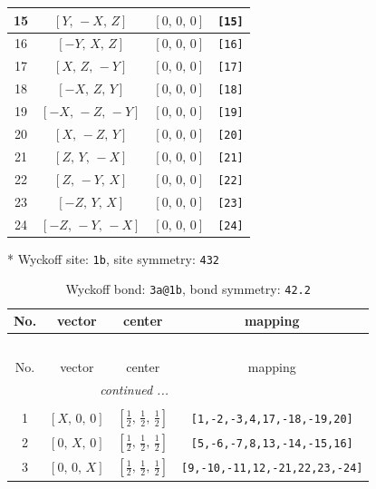\documentclass[fleqn,8pt]{jsarticle}
\begin{document}
\begin{longtable}{cccc}
15 & $\left[ Y,\, - X,\, Z \right]$ & $\left[ 0,\, 0,\, 0 \right]$ & {\tt [15]} \\ \hline
16 & $\left[ - Y,\, X,\, Z \right]$ & $\left[ 0,\, 0,\, 0 \right]$ & {\tt [16]} \\ \hline
17 & $\left[ X,\, Z,\, - Y \right]$ & $\left[ 0,\, 0,\, 0 \right]$ & {\tt [17]} \\ \hline
18 & $\left[ - X,\, Z,\, Y \right]$ & $\left[ 0,\, 0,\, 0 \right]$ & {\tt [18]} \\ \hline
19 & $\left[ - X,\, - Z,\, - Y \right]$ & $\left[ 0,\, 0,\, 0 \right]$ & {\tt [19]} \\ \hline
20 & $\left[ X,\, - Z,\, Y \right]$ & $\left[ 0,\, 0,\, 0 \right]$ & {\tt [20]} \\ \hline
21 & $\left[ Z,\, Y,\, - X \right]$ & $\left[ 0,\, 0,\, 0 \right]$ & {\tt [21]} \\ \hline
22 & $\left[ Z,\, - Y,\, X \right]$ & $\left[ 0,\, 0,\, 0 \right]$ & {\tt [22]} \\ \hline
23 & $\left[ - Z,\, Y,\, X \right]$ & $\left[ 0,\, 0,\, 0 \right]$ & {\tt [23]} \\ \hline
24 & $\left[ - Z,\, - Y,\, - X \right]$ & $\left[ 0,\, 0,\, 0 \right]$ & {\tt [24]} \\
\end{longtable}
* Wyckoff site: {\tt 1b}, site symmetry: {\tt 432}
\renewcommand{\arraystretch}{1.2}
\begin{longtable}{cccc}
\caption{Wyckoff bond: {\tt 3a@1b}, bond symmetry: {\tt 42.2}}
 \\
 \hline \hline
No. & vector & center & mapping \\ \hline \endfirsthead

\multicolumn{3}{l}{\tablename\ \thetable{}} \\
 \hline \hline
No. & vector & center & mapping \\ \hline \endhead

 \hline \hline
\multicolumn{3}{r}{\footnotesize\it continued ...} \\ \endfoot

 \hline \hline
\multicolumn{3}{r}{} \\ \endlastfoot

1 & $\left[ X,\, 0,\, 0 \right]$ & $\left[ \frac{1}{2},\, \frac{1}{2},\, \frac{1}{2} \right]$ & {\tt [1,-2,-3,4,17,-18,-19,20]} \\ \hline
2 & $\left[ 0,\, X,\, 0 \right]$ & $\left[ \frac{1}{2},\, \frac{1}{2},\, \frac{1}{2} \right]$ & {\tt [5,-6,-7,8,13,-14,-15,16]} \\ \hline
3 & $\left[ 0,\, 0,\, X \right]$ & $\left[ \frac{1}{2},\, \frac{1}{2},\, \frac{1}{2} \right]$ & {\tt [9,-10,-11,12,-21,22,23,-24]} \\
\end{longtable}
\end{document}
